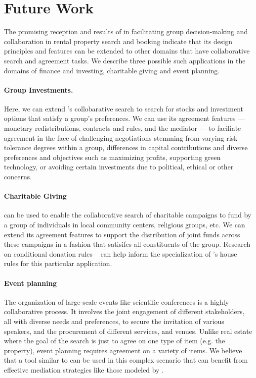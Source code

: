 \section{Future Work}
The promising reception and results of \tool in facilitating group decision-making and collaboration in rental property search and booking indicate that its design principles and features can be extended to other domains that have collaborative search and agreement tasks. We describe three possible such applications in the domains of finance and investing, charitable giving and 
event planning.

\paragraph{Group Investments.} Here, we can extend \tool's collobarative search to search for stocks and investment options that satisfy a group's preferences. We can use its agreement features --- monetary redistributions, contracts and rules, and the \cbot mediator --- to faciliate agreement in the face of challenging negotiations stemming from varying risk tolerance degrees within a group, differences in capital contributions and diverse preferences and objectives such as maximizing profits, supporting green technology, or avoiding certain investments due to political, ethical or other concerns.


\paragraph{Charitable Giving} \tool can be used to enable the collaborative search of charitable campaigns to fund by a group of individuals in local community centers, religious groups, etc. We can extend its agreement features to support the distribution of joint funds across these campaigns in a fashion that satisifes all constituents of the group. Research on conditional donation rules ~\cite{codo} can help inform the specialization of \tool's house rules for this particular application. 



\paragraph{Event planning} The organization of large-scale events like scientific conferences is a highly collaborative process. It involves the joint engagement of different stakeholders, all with diverse needs and preferences, to secure the invitation of various speakers, and the procurement of different services, and venues. Unlike real estate where the goal of the search is just to agree on one type of item (e.g. the property), event planning requires agreement on a variety of items. We believe that a tool similar to \tool can be used in this complex scenario that can benefit from effective mediation strategies like those modeled by \cbot. 

